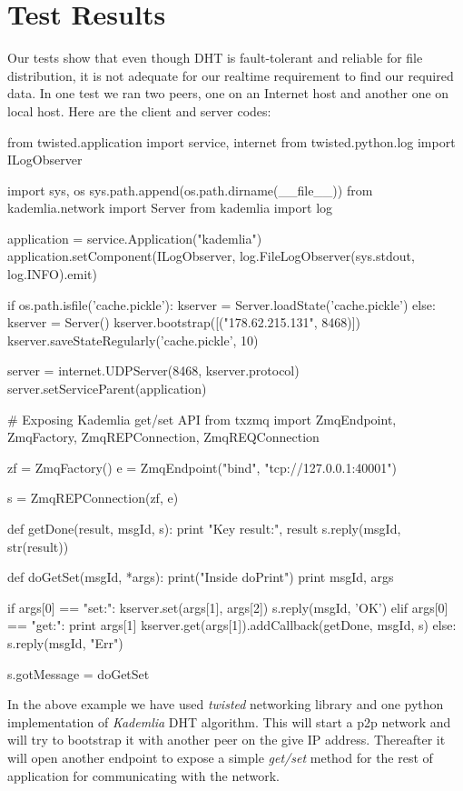 \section{Test Results}
Our tests show that even though DHT is fault-tolerant and reliable for file distribution, it is not adequate for our realtime requirement to find our required data. In one test we ran two peers, one on an Internet host and another one on local host. Here are the client and server codes:

\begin{python}
from twisted.application import service, internet
from twisted.python.log import ILogObserver

import sys, os
sys.path.append(os.path.dirname(__file__))
from kademlia.network import Server
from kademlia import log

application = service.Application("kademlia")
application.setComponent(ILogObserver, 
	log.FileLogObserver(sys.stdout, log.INFO).emit)

if os.path.isfile('cache.pickle'):
    kserver = Server.loadState('cache.pickle')
else:
    kserver = Server()
    kserver.bootstrap([("178.62.215.131", 8468)])
kserver.saveStateRegularly('cache.pickle', 10)

server = internet.UDPServer(8468, kserver.protocol)
server.setServiceParent(application)


# Exposing Kademlia get/set API
from txzmq import ZmqEndpoint, ZmqFactory, ZmqREPConnection,
 ZmqREQConnection

zf = ZmqFactory()
e = ZmqEndpoint("bind", "tcp://127.0.0.1:40001")

s = ZmqREPConnection(zf, e)

def getDone(result, msgId, s):
    print "Key result:", result
    s.reply(msgId, str(result))

def doGetSet(msgId, *args):
    print("Inside doPrint")
    print msgId, args

    if args[0] == "set:":
        kserver.set(args[1], args[2])
        s.reply(msgId, 'OK')
    elif args[0] == "get:":
        print args[1]
        kserver.get(args[1]).addCallback(getDone, msgId, s)
    else:
        s.reply(msgId, "Err")

s.gotMessage = doGetSet
\end{python}

In the above example we have used \textit{twisted} networking library\cite{TwistedMatrix} and one python implementation\cite{KademliaImpl} of \textit{Kademlia} DHT algorithm\cite{KademliaPaper}. This will start a p2p network and will try to bootstrap it with another peer on the give IP address. Thereafter it will open another endpoint to expose a simple \textit{get/set} method for the rest of application for communicating with the network.

